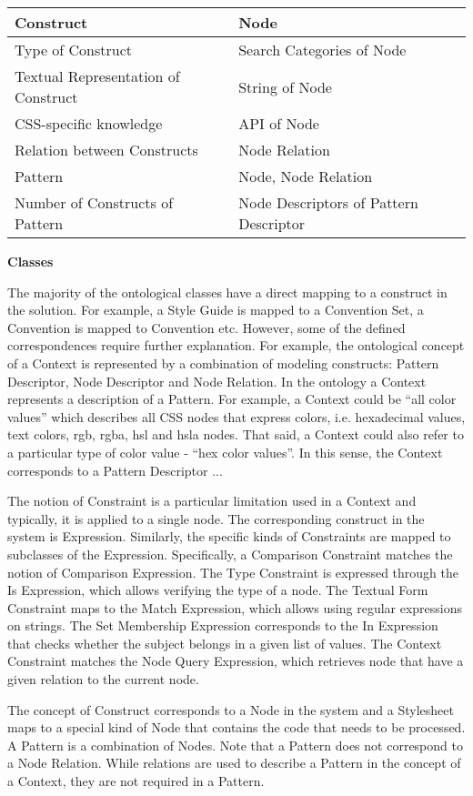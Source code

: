 \documentclass[parskip=full]{uvamscse}
\begin{document}
\begin{center}
\begin{longtable}{ | p{17em} | p{23em} | }
Construct & Node \\ \hline
Type of Construct & Search Categories of Node \\ \hline
Textual Representation of Construct & String of Node \\ \hline
CSS-specific knowledge & API of Node \\ \hline
Relation between Constructs & Node Relation \\ \hline
Pattern & Node, Node Relation \\ \hline
Number of Constructs of Pattern & Node Descriptors of Pattern Descriptor \\ \hline
\end{longtable}
\end{center}

\textbf{Classes}

The majority of the ontological classes have a direct mapping to a construct in the solution. For
example, a Style Guide is mapped to a Convention Set, a Convention is mapped to Convention etc.
However, some of the defined correspondences require further explanation. For example, the ontological concept of a Context is represented by a combination of modeling constructs: Pattern Descriptor, Node Descriptor and Node Relation. In the ontology a Context represents a description of a Pattern. For example, a Context could be ``all color values'' which describes all CSS nodes that express colors, i.e. hexadecimal values, text colors, rgb, rgba, hsl and hsla nodes. That said, a Context could also refer to a particular type of color value - ``hex color values''. In this sense, the Context corresponds to a Pattern Descriptor ...

The notion of Constraint is a particular limitation used in a Context and typically, it is applied
to a single node. The corresponding construct in the system is Expression. Similarly, the specific
kinds of Constraints are mapped to subclasses of the Expression. Specifically, a Comparison
Constraint matches the notion of Comparison Expression. The Type Constraint is expressed through the
Is Expression, which allows verifying the type of a node. The Textual Form Constraint maps to the
Match Expression, which allows using regular expressions on strings. The Set Membership Expression
corresponds to the In Expression that checks whether the subject belongs in a given list of values.
The Context Constraint matches the Node Query Expression, which retrieves node that have a given
relation to the current node.

The concept of Construct corresponds to a Node in the system and a Stylesheet maps to a special kind
of Node that contains the code that needs to be processed. A Pattern is a combination of Nodes. Note
that a Pattern does not correspond to a Node Relation. While relations are used to describe a
Pattern in the concept of a Context, they are not required in a Pattern.
\end{document}
